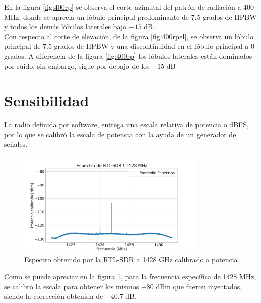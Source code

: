 En la figura \ref{fig:400rp} se observa el corte azimutal del patrón de radiación a 400 MHz, donde se aprecia un lóbulo principal predominante de 7.5 grados de HPBW y todos los demás lóbulos laterales bajo $-15$ dB.\\


Con respecto al corte de elevación, de la figura \ref{fig:400rpel}, se observa un lóbulo principal de 7.5 grados de HPBW y una discontinuidad en el lóbulo principal a 0 grados. A diferencia de la figura \ref{fig:400rp} los lóbulos laterales están dominados por ruido, sin embargo, sigue por debajo de los $-15$ dB\\



\section{Sensibilidad}

La radio definida por software, entrega una escala relativa de potencia o dBFS, por lo que se calibró la escala de potencia con la ayuda de un generador de señales.\\

\begin{figure}
    \centering
    \includegraphics[width=0.8\textwidth]{img/rtl1428}
    \caption{Espectro obtenido por la RTL-SDR a 1428 GHz calibrado a potencia}
    \label{fig:rtl1428}
\end{figure}

Como se puede apreciar en la figura \ref{fig:rtl1428}, para la frecuencia específica de 1428 MHz, se calibró la escala para obtener los mismos $-80$ dBm que fueron inyectados, siendo la corrección obtenida de $-40.7$ dB.\\

